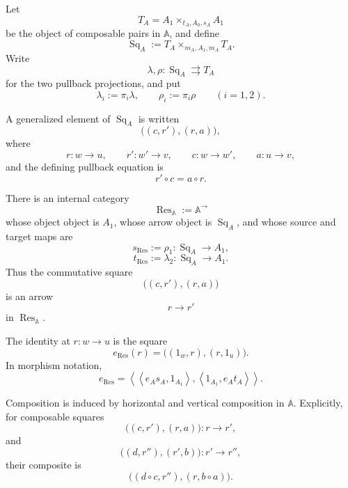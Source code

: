 \begin{theorem}
\label{thm:total-residual-opfibration}
    Let
    \[
        T_A
        =
        A_1\times_{t_A,A_0,s_A}A_1
    \]
    be the object of composable pairs in \(\mathbb A\), and define
    \[
        \operatorname{Sq}_A
        :=
        T_A\times_{m_A,A_1,m_A}T_A.
    \]
    Write
    \[
        \lambda,\rho:
        \operatorname{Sq}_A\rightrightarrows T_A
    \]
    for the two pullback projections, and put
    \[
        \lambda_i:=\pi_i\lambda,
        \qquad
        \rho_i:=\pi_i\rho
        \qquad
        (i=1,2).
    \]

    A generalized element of \(\operatorname{Sq}_A\) is written
    \[
        \bigl((c,r'),(r,a)\bigr),
    \]
    where
    \[
        r:w\to u,
        \qquad
        r':w'\to v,
        \qquad
        c:w\to w',
        \qquad
        a:u\to v,
    \]
    and the defining pullback equation is
    \[
        r'\circ c=a\circ r.
    \]

    There is an internal category
    \[
        \operatorname{Res}_{\mathbb A}
        :=
        \mathbb A^\to
    \]
    whose object object is \(A_1\), whose arrow object is
    \(\operatorname{Sq}_A\), and whose source and target maps are
    \[
        s_{\operatorname{Res}}
        :=
        \rho_1:
        \operatorname{Sq}_A\to A_1,
    \]
    \[
        t_{\operatorname{Res}}
        :=
        \lambda_2:
        \operatorname{Sq}_A\to A_1.
    \]
    Thus the commutative square
    \[
        \bigl((c,r'),(r,a)\bigr)
    \]
    is an arrow
    \[
        r\longrightarrow r'
    \]
    in \(\operatorname{Res}_{\mathbb A}\).

    The identity at \(r:w\to u\) is the square
    \[
        e_{\operatorname{Res}}(r)
        =
        \bigl(
            (1_w,r),
            (r,1_u)
        \bigr).
    \]
    In morphism notation,
    \[
        e_{\operatorname{Res}}
        =
        \left\langle
            \left\langle
                e_As_A,
                1_{A_1}
            \right\rangle,
            \left\langle
                1_{A_1},
                e_At_A
            \right\rangle
        \right\rangle.
    \]

    Composition is induced by horizontal and vertical composition in
    \(\mathbb A\). Explicitly, for composable squares
    \[
        \bigl((c,r'),(r,a)\bigr):
        r\to r',
    \]
    and
    \[
        \bigl((d,r''),(r',b)\bigr):
        r'\to r'',
    \]
    their composite is
    \[
        \bigl(
            (d\circ c,r''),
            (r,b\circ a)
        \bigr).
    \]


\end{theorem}
